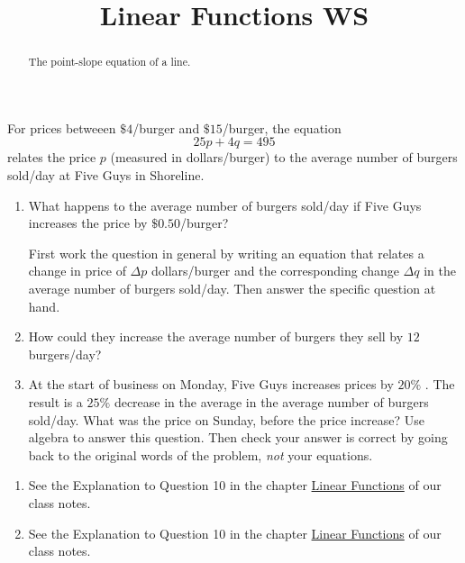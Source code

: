 \documentclass{ximera}
\title{Linear Functions WS}
\begin{document}
\begin{abstract}
The point-slope equation of a line.
\end{abstract}
\maketitle

\begin{question} \label{Qppef3231}
For prices betweeen $\$4$/burger and $\$15$/burger, the equation
\[
     25p + 4q = 495
\]
relates the price $p$ (measured in dollars/burger) to the average number of burgers sold/day at Five Guys in Shoreline.

\begin{enumerate}

\item What happens to the average number of burgers sold/day if Five Guys increases the price by $\$0.50$/burger? 

First work the question in general by writing an equation that relates a change in price of $\Delta p$ dollars/burger and the corresponding change $\Delta q$ in the average number of burgers sold/day. Then answer the specific question at hand.

\item How could they increase the average number of burgers they sell by $12$ burgers/day? 

\item At the start of business on Monday, Five Guys increases prices by $20\%$ . The result is a  $25\%$ decrease in the average in the average number of burgers sold/day. What was the price on Sunday, before the price increase? Use algebra to answer this question. Then check your answer is correct by going back to the original words of the problem, \emph{not} your equations.

\end{enumerate}

\begin{explanation}
\begin{enumerate}
\item See the Explanation to Question 10 in the chapter \href{https://ximera.osu.edu/precalc1/PreCalculus1/LinearFunctions/LinearFunctions}{Linear Functions} of our class notes.

\item See the Explanation to Question 10 in the chapter \href{https://ximera.osu.edu/precalc1/PreCalculus1/LinearFunctions/LinearFunctions}{Linear Functions} of our class notes.


\end{enumerate}
\end{explanation}
\end{question}
\end{document}
